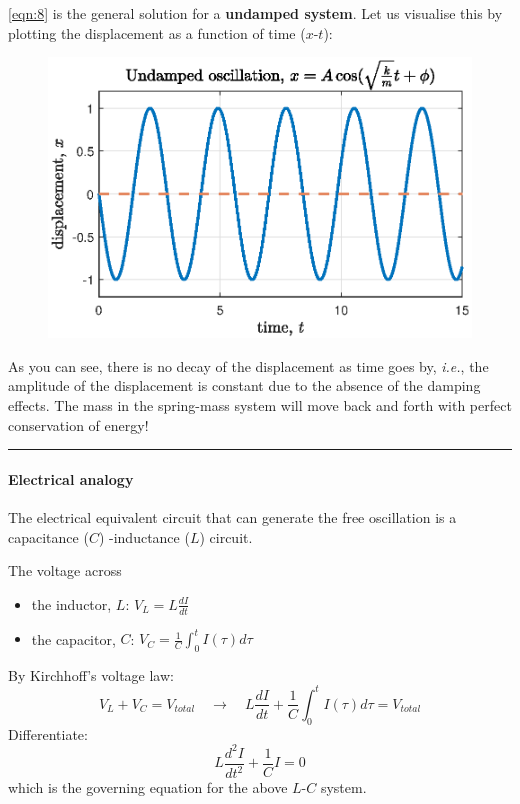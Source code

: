 \documentclass[12pt,a4paper]{article}
\begin{document}
\autoref{eqn:8} is the general solution for a \textbf{undamped system}. Let us visualise this by plotting the displacement as a function of time ($x$-$t$):
\begin{figure}[H]
    \centering
    \includegraphics[width=.7\textwidth]{undamped_oscillation.eps}
    \label{fig:my_label}
\end{figure}
As you can see, there is no decay of the displacement as time goes by, \textit{i.e.}, the amplitude of the displacement is constant due to the absence of the damping effects. The mass in the spring-mass system will move back and forth with perfect conservation of energy! \\

\hrule \vspace{.1cm}
\paragraph{Electrical analogy} The electrical equivalent circuit that can generate the free oscillation is a capacitance ($C$) -inductance ($L$) circuit. 
\begin{figure}[H]
    \centering
\end{figure}
The voltage across 
\begin{itemize}
    \item the inductor, $L$: $\displaystyle V_{L} = L\frac{dI}{dt}$
    \item the capacitor, $C$: $\displaystyle V_{C} = \frac{1}{C}\int_{0}^{t} I(\tau) d\tau$
\end{itemize}
By Kirchhoff's voltage law:
\[
    V_L + V_C = V_{total} \quad \to \quad L \frac{dI}{dt} + \frac{1}{C}\int_{0}^{t} I(\tau) d\tau = V_{total} 
\]
Differentiate:
\[
    L \frac{d^2I}{dt^2} + \frac{1}{C}I = 0
\]
which is the governing equation for the above $L$-$C$ system.\\
\end{document}

